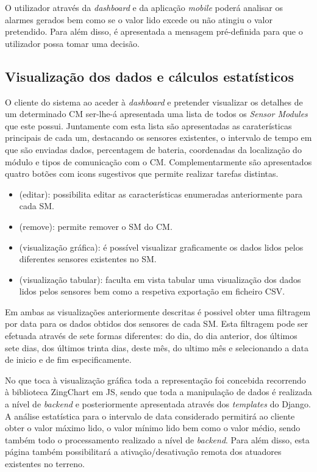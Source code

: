 O utilizador através da \textit{dashboard} e da aplicação \textit{mobile} poderá analisar os alarmes gerados bem como se o valor lido excede ou não atingiu o valor pretendido. Para além disso, é apresentada a mensagem pré-definida para que o utilizador possa tomar uma decisão.   



\newpage
\subsection{Visualização dos dados e cálculos estatísticos}

O cliente do sistema ao aceder à \textit{dashboard} e pretender visualizar os detalhes de um determinado \acl{CM} ser-lhe-á apresentada uma lista de todos os \textit{Sensor Modules} que este possui. Juntamente com esta lista são apresentadas as caraterísticas principais de cada um, destacando os sensores existentes, o intervalo de tempo em que são enviadas dados, percentagem de bateria, coordenadas da localização do módulo e tipos de comunicação com o \acl{CM}. Complementarmente são apresentados quatro botões com icons sugestivos que permite realizar tarefas distintas.  

\begin{itemize}
	\item \faEdit \space (editar): possibilita editar as características enumeradas anteriormente para cada \acl{SM}. 
	\item \faTrash \space (remove): permite remover o \acl{SM} do \ac{CM}. 
	\item \faBarChart \space (visualização gráfica): é possível visualizar graficamente os dados lidos pelos diferentes sensores existentes no \acl{SM}. 
	\item \faDatabase \space (visualização tabular): faculta em vista tabular uma visualização dos dados lidos pelos sensores bem como a respetiva exportação em ficheiro \ac{CSV}. 
\end{itemize}


Em ambas as visualizações anteriormente descritas é possivel obter uma filtragem por data para os dados obtidos dos sensores de cada \acl{SM}. Esta filtragem pode ser efetuada através de sete formas diferentes: do dia, do dia anterior, dos últimos sete dias, dos últimos trinta dias, deste mês, do ultimo mês e selecionando a data de inicio e de fim especificamente. 


No que toca à visualização gráfica toda a representação foi concebida recorrendo à biblioteca ZingChart em \ac{JS}, sendo que toda a manipulação de dados é realizada a nível de \textit{backend} e posteriormente apresentada através dos \textit{templates} do Django. A análise estatística para o intervalo de data considerado permitirá ao cliente obter o valor máximo lido, o valor mínimo lido bem como o valor médio, sendo também todo o processamento realizado a nível de \textit{backend}. Para além disso, esta página também possibilitará a ativação/desativação remota dos atuadores existentes no terreno. 


